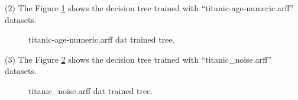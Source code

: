 \documentclass{article} %
\begin{document}
(2) The Figure \ref{fig:titanic-age-numeric} shows the decision tree
trained with ``titanic-age-numeric.arff'' datasets.
\begin{figure}[h]
\begin{center}
\end{center}
\caption{titanic-age-numeric.arff dat trained tree.}
\label{fig:titanic-age-numeric}
\end{figure}

(3) The Figure \ref{fig:titanic_noise} shows the decision tree
trained with ``titanic\_noise.arff'' datasets.
\begin{figure}[h]
\begin{center}
\end{center}
\caption{titanic\_noise.arff dat trained tree.}
\label{fig:titanic_noise}
\end{figure}
\end{document}
